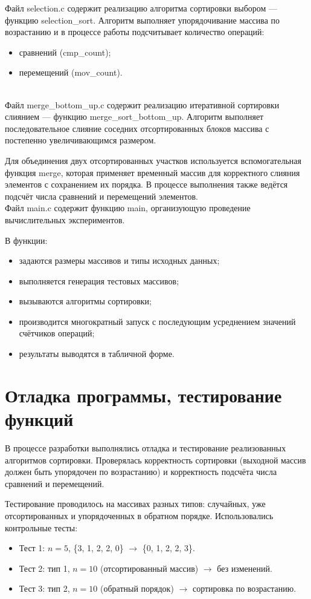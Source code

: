 \documentclass[a4paper,12pt]{article}
\newcommand{\code}[1]{{\ttfamily #1}}
\begin{document}
Файл \code{selection.c} содержит реализацию алгоритма сортировки выбором —
функцию \code{selection\_sort}. Алгоритм выполняет упорядочивание массива по
возрастанию и в процессе работы подсчитывает количество операций:
\begin{itemize}
\item сравнений (\code{cmp\_count});
\item перемещений (\code{mov\_count}).
\end{itemize}\\

Файл \code{merge\_bottom\_up.c} содержит реализацию итеративной сортировки
слиянием — функцию \code{merge\_sort\_bottom\_up}. Алгоритм выполняет
последовательное слияние соседних отсортированных блоков массива с
постепенно увеличивающимся размером.

Для объединения двух отсортированных участков используется вспомогательная
функция \code{merge}, которая применяет временный массив для корректного
слияния элементов с сохранением их порядка. В процессе выполнения также
ведётся подсчёт числа сравнений и перемещений элементов.\\

Файл \code{main.c} содержит функцию \code{main}, организующую проведение
вычислительных экспериментов.

В функции:
\begin{itemize}
\item задаются размеры массивов и типы исходных данных;
\item выполняется генерация тестовых массивов;
\item вызываются алгоритмы сортировки;
\item производится многократный запуск с последующим усреднением значений счётчиков операций;
\item результаты выводятся в табличной форме.
\end{itemize}

\section{Отладка программы, тестирование функций}

В процессе разработки выполнялись отладка и тестирование реализованных
алгоритмов сортировки. Проверялась корректность сортировки (выходной
массив должен быть упорядочен по возрастанию) и корректность подсчёта
числа сравнений и перемещений.

Тестирование проводилось на массивах разных типов: случайных, уже
отсортированных и упорядоченных в обратном порядке. Использовались
контрольные тесты:
\begin{itemize}
\item Тест 1: $n = 5$, \{3, 1, 2, 2, 0\} $\rightarrow$ \{0, 1, 2, 2, 3\}.
\item Тест 2: тип 1, $n = 10$ (отсортированный массив) $\rightarrow$ без изменений.
\item Тест 3: тип 2, $n = 10$ (обратный порядок) $\rightarrow$ сортировка по возрастанию.
\end{itemize}
\end{document}
